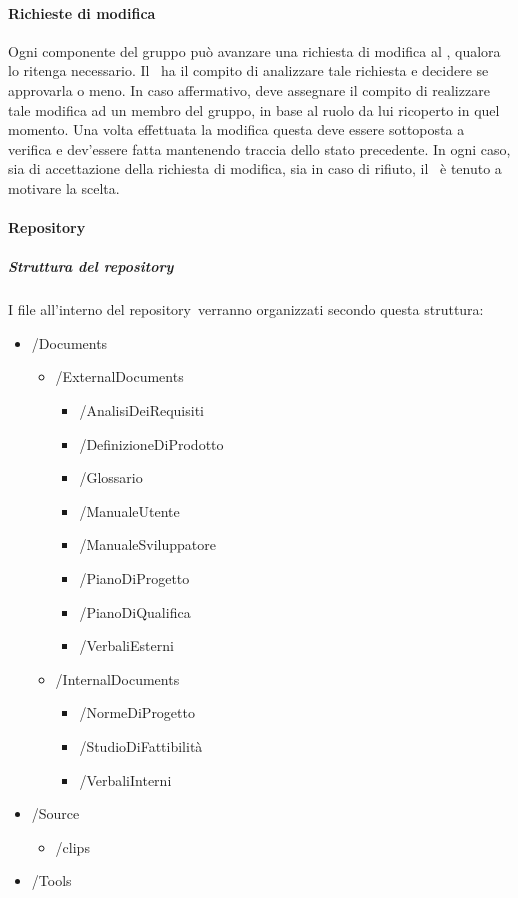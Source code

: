 \documentclass[../NormeProgetto.text]{subfiles}
\begin{document}
		\paragraph{Richieste di modifica}
			Ogni componente del gruppo può avanzare una richiesta di modifica al \responsabilediprogetto, qualora lo ritenga necessario. Il \responsabilediprogetto\ ha il compito di analizzare tale richiesta e decidere se approvarla o meno. In caso affermativo, deve assegnare il compito di realizzare tale modifica ad un membro del gruppo, in base al ruolo da lui ricoperto in quel momento. Una volta effettuata la modifica questa deve essere sottoposta a verifica e dev'essere fatta mantenendo traccia dello stato precedente. In ogni caso, sia di accettazione della richiesta di modifica, sia in caso di rifiuto, il \responsabilediprogetto\ è tenuto a motivare la scelta.
		\paragraph{Repository}	
			\subparagraph{Struttura del repository}
				I file all'interno del repository\g\ verranno organizzati secondo questa struttura:
				\begin{itemize}
					\item /Documents
					\begin{itemize}
						\item /ExternalDocuments
						\begin{itemize}
							\item /AnalisiDeiRequisiti
							\item /DefinizioneDiProdotto
							\item /Glossario
							\item /ManualeUtente
							\item /ManualeSviluppatore
							\item /PianoDiProgetto
							\item /PianoDiQualifica
							\item /VerbaliEsterni
						\end{itemize}
						\item /InternalDocuments
						\begin{itemize}
							\item /NormeDiProgetto
							\item /StudioDiFattibilità
							\item /VerbaliInterni
						\end{itemize}
					\end{itemize}
					\item /Source
						\begin{itemize}
							\item /clips
						\end{itemize}
					\item /Tools
				\end{itemize}
\end{document}
